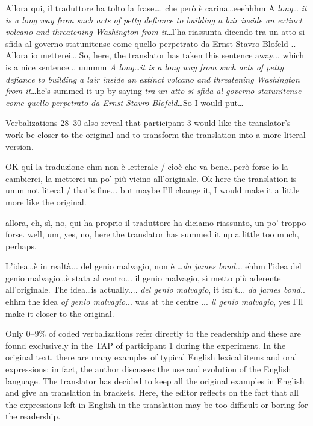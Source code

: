 \documentclass[output=paper]{LSP/langsci}
\begin{document}
\ea \label{troqe-marchan:ex:30} 
\glt Allora qui, il traduttore ha tolto la frase\ldots . che però è carina\ldots  eeehhhm A \textit{long\ldots } \textit{it is a long way fr}\textit{om such acts of petty defiance to building a lair inside an extinct volcano and threatening Washington} \textit{from it}\ldots  l'ha riassunta dicendo tra un atto si sfida al governo statunitense come quello perpetrato da Ernst Stavro Blofeld ..   Allora io metterei\ldots 
\glt So, here, the translator has taken this sentence away... which is a nice sentence... uuumm \textit{A long\ldots  it is a long way from such acts of petty defiance to building a lair inside an extinct volcano and threatening Washington from it}\ldots  he's summed it up by saying \textit{tra un atto si sfida al governo statunitense come quello perpetrato da Ernst Stavro Blofeld}\ldots  So I would put\ldots  
\z

Verbalizations 28{}--30 also reveal that participant 3 would like the translator's work be closer to the original and to transform the translation into a more literal version. 

\ea \label{troqe-marchan:ex:31} 
\glt OK qui la traduzione ehm non è letterale / cioè che va bene\ldots  però forse io la cambierei, la metterei un po' più vicino all'originale.
\glt Ok here the translation is umm not literal / that's fine... but maybe I'll change it, I would make it a little more like the original.
\z 

\ea \label{troqe-marchan:ex:32} 
\glt allora, eh, sì, no, qui ha proprio il traduttore ha diciamo riassunto, un po' troppo forse.
\glt well, um, yes, no, here the translator has summed it up a little too much, perhaps.
\z 

\ea \label{troqe-marchan:ex:33} 
\glt L'idea\ldots  è in realtà... del genio malvagio, non è \ldots  \textit{da james bond}... ehhm  l'idea del genio malvagio\ldots  è stata al centro... il genio malvagio, sì metto più aderente all'originale.
\glt The idea\ldots  is actually.... \textit{del genio malvagio}, it isn't... \textit{da james bond}.. ehhm the idea \textit{of genio malvagio}...  was at the centre ... \textit{il genio malvagio}, yes I'll make it closer to the original.
\z

Only 0--9\% of coded verbalizations refer directly to the readership and these are found exclusively in the TAP of participant 1 during the experiment. In the original text, there are many examples of typical English lexical items and oral expressions; in fact, the author discusses the use and evolution of the English language. The translator has decided to keep all the original examples in English and give an  translation in brackets. Here, the editor reflects on the fact that all the expressions left in English in the  translation may be too difficult or boring for the readership. 
\end{document}
